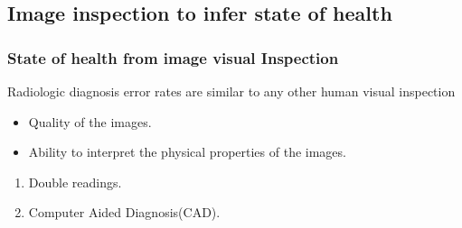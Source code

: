 
\subsection{Image inspection to infer state of health}

\begin{frame}\frametitle{State of health from image visual Inspection}
\begin{block}{Radiologic diagnosis error rates are similar to any other human visual inspection}
  \begin{itemize}
    \item Quality of the images.
    \item Ability to interpret the physical properties of the images.
  \end{itemize}
\end{block}
  \begin{enumerate}
    \item Double readings.
    \item Computer Aided Diagnosis(CAD).

  \end{enumerate}
\end{frame}


